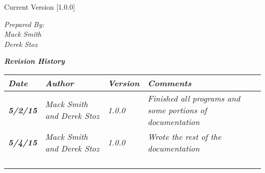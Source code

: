 


Current Version [1.0.0]
\vspace*{5mm}

{\color{MSBlue3}
\noindent
\textit{Prepared By:}\\
\textit{Mack Smith}\\
\textit{Derek Stoz}
}

\vfill
\noindent
{\color{color02} \textit{\textbf{Revision History}}}\\
\begin{tabular}{|>{\raggedright}p{1.5cm}|>{\raggedright}p{3cm}|>{\raggedright}p{1.5cm}|>{\raggedright}p{9cm}|}
\hline
\textit{\textbf{Date}} &  \textit{\textbf{Author}} & \textit{\textbf{Version}} & \textit{\textbf{Comments}}\tabularnewline
\hline
 \textit{\textbf{5/2/15}} & \textit{Mack Smith and Derek Stoz} & \textit{1.0.0} & \textit{Finished all programs and some portions of documentation}\tabularnewline
\hline
 \textit{\textbf{5/4/15}} & \textit{Mack Smith and Derek Stoz} & \textit{1.0.0} & \textit{Wrote the rest of the documentation}\tabularnewline
 \hline
 &  &  & \tabularnewline
\hline
 &  &  & \tabularnewline
\hline
 &  &  & \tabularnewline
\hline
 &  &  & \tabularnewline
\hline
\end{tabular}
\vfill

